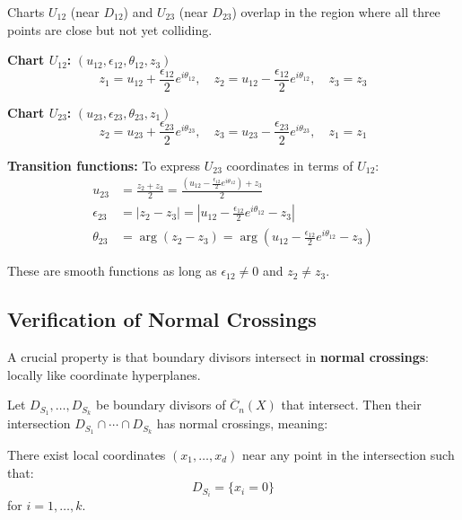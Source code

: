 \begin{example}\label{ex:transition-d12-d23}
Charts $U_{12}$ (near $D_{12}$) and $U_{23}$ (near $D_{23}$) overlap in the region where
all three points are close but not yet colliding.

\textbf{Chart $U_{12}$:} $(u_{12}, \epsilon_{12}, \theta_{12}, z_3)$
$$z_1 = u_{12} + \frac{\epsilon_{12}}{2} e^{i\theta_{12}}, \quad
z_2 = u_{12} - \frac{\epsilon_{12}}{2} e^{i\theta_{12}}, \quad z_3 = z_3$$

\textbf{Chart $U_{23}$:} $(u_{23}, \epsilon_{23}, \theta_{23}, z_1)$
$$z_2 = u_{23} + \frac{\epsilon_{23}}{2} e^{i\theta_{23}}, \quad
z_3 = u_{23} - \frac{\epsilon_{23}}{2} e^{i\theta_{23}}, \quad z_1 = z_1$$

\textbf{Transition functions:}
To express $U_{23}$ coordinates in terms of $U_{12}$:
\begin{align}
u_{23} &= \frac{z_2 + z_3}{2} = \frac{(u_{12} - \frac{\epsilon_{12}}{2}e^{i\theta_{12}}) + z_3}{2}\\
\epsilon_{23} &= |z_2 - z_3| = \left| u_{12} - \frac{\epsilon_{12}}{2}e^{i\theta_{12}} - z_3 \right|\\
\theta_{23} &= \arg(z_2 - z_3) = \arg\left(u_{12} - \frac{\epsilon_{12}}{2}e^{i\theta_{12}} - z_3\right)
\end{align}

These are smooth functions as long as $\epsilon_{12} \neq 0$ and $z_2 \neq z_3$.
\end{example}

\subsection{Verification of Normal Crossings}

A crucial property is that boundary divisors intersect in \textbf{normal crossings}: locally
like coordinate hyperplanes.

\begin{theorem}\label{thm:normal-crossings-verified}
Let $D_{S_1}, \ldots, D_{S_k}$ be boundary divisors of $\overline{C}_n(X)$ that intersect.
Then their intersection $D_{S_1} \cap \cdots \cap D_{S_k}$ has normal crossings, meaning:

There exist local coordinates $(x_1, \ldots, x_d)$ near any point in the intersection such that:
$$D_{S_i} = \{x_i = 0\}$$
for $i = 1, \ldots, k$.
\end{theorem}

